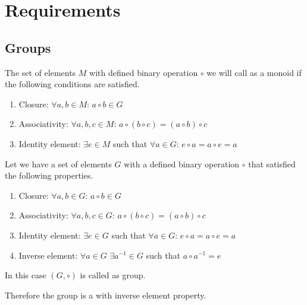 \chapter*{Requirements}

\section{Groups}

\begin{definition}[Monoid]
  The set of elements $M$ with defined binary operation $\circ$ we will call
  as a monoid if the following conditions are satisfied.
  \begin{enumerate}
  \item Closure: $\forall a, b \in M$: $a \circ b \in G$
  \item Associativity: $\forall a, b, c \in M$:
    $a \circ \left( b \circ c \right) =
    \left( a \circ b \right) \circ c$
  \item Identity element: $\exists e \in M$ such that
    $\forall a \in G$: $e \circ a = a \circ e = a$
  \end{enumerate}
  \label{def:monoid}
\end{definition}

\begin{definition}[Group]
  Let we have a set of elements $G$ with a defined binary operation
  $\circ$ that satisfied the following properties.
  \begin{enumerate}
  \item Closure: $\forall a, b \in G$: $a \circ b \in G$
  \item Associativity: $\forall a, b, c \in G$:
    $a \circ \left( b \circ c \right) =
    \left( a \circ b \right) \circ c$
  \item Identity element: $\exists e \in G$ such that
    $\forall a \in G$: $e \circ a = a \circ e = a$
  \item Inverse element: $\forall a \in G$ $\exists a^{-1} \in G$ such that
    $a \circ a^{-1} = e$
  \end{enumerate}
  In this case $\left(G, \circ\right)$ is called as group.
  \label{def:group}
\end{definition}
Therefore the group is a  with inverse element
property. 

